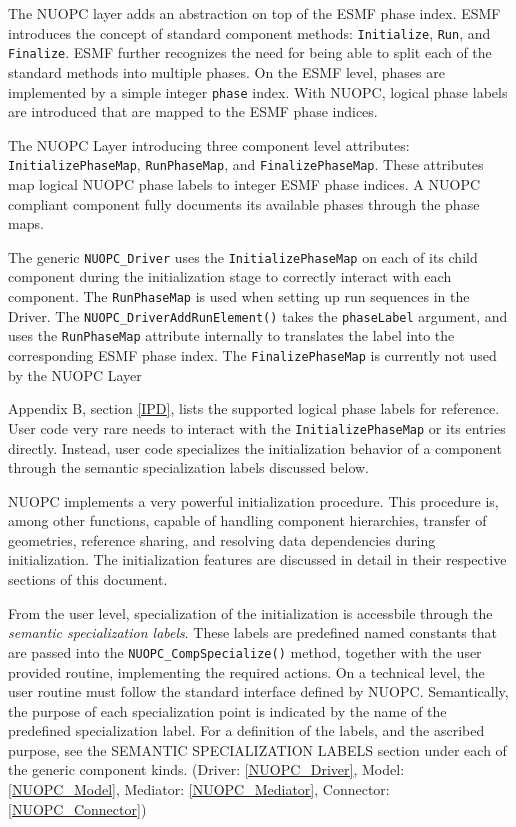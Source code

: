 %

\label{PhaseMaps}

The NUOPC layer adds an abstraction on top of the ESMF phase index. ESMF introduces the concept of standard component methods: {\tt Initialize}, {\tt Run}, and {\tt Finalize}. ESMF further recognizes the need for being able to split each of the standard methods into multiple phases. On the ESMF level, phases are implemented by a simple integer {\tt phase} index. With NUOPC, logical phase labels are introduced that are mapped to the ESMF phase indices.

The NUOPC Layer introducing three component level attributes: {\tt InitializePhaseMap}, {\tt RunPhaseMap}, and {\tt FinalizePhaseMap}. These attributes map logical NUOPC phase labels to integer ESMF phase indices. A NUOPC compliant component fully documents its available phases through the phase maps.

The generic {\tt NUOPC\_Driver} uses the {\tt InitializePhaseMap} on each of its child component during the initialization stage to correctly interact with each component. The {\tt RunPhaseMap} is used when setting up run sequences in the Driver. The {\tt NUOPC\_DriverAddRunElement()} takes the {\tt phaseLabel} argument, and uses the {\tt RunPhaseMap} attribute internally to translates the label into the corresponding ESMF phase index. The {\tt FinalizePhaseMap} is currently not used by the NUOPC Layer

Appendix B, section \ref{IPD}, lists the supported logical phase labels for reference. User code very rare needs to interact with the {\tt InitializePhaseMap} or its entries directly. Instead, user code specializes the initialization behavior of a component through the semantic specialization labels discussed below.

NUOPC implements a very powerful initialization procedure. This procedure is, among other functions, capable of handling component hierarchies, transfer of geometries, reference sharing, and resolving data dependencies during initialization. The initialization features are discussed in detail in their respective sections of this document.

From the user level, specialization of the initialization is accessbile through the {\em semantic specialization labels}. These labels are predefined named constants that are passed into the {\tt NUOPC\_CompSpecialize()} method, together with the user provided routine, implementing the required actions. On a technical level, the user routine must follow the standard interface defined by NUOPC. Semantically, the purpose of each specialization point is indicated by the name of the predefined specialization label. For a definition of the labels,  and the ascribed purpose, see the {\sf SEMANTIC SPECIALIZATION LABELS} section under each of the generic component kinds. (Driver: \ref{NUOPC_Driver}, Model: \ref{NUOPC_Model}, Mediator: \ref{NUOPC_Mediator}, Connector: \ref{NUOPC_Connector})

